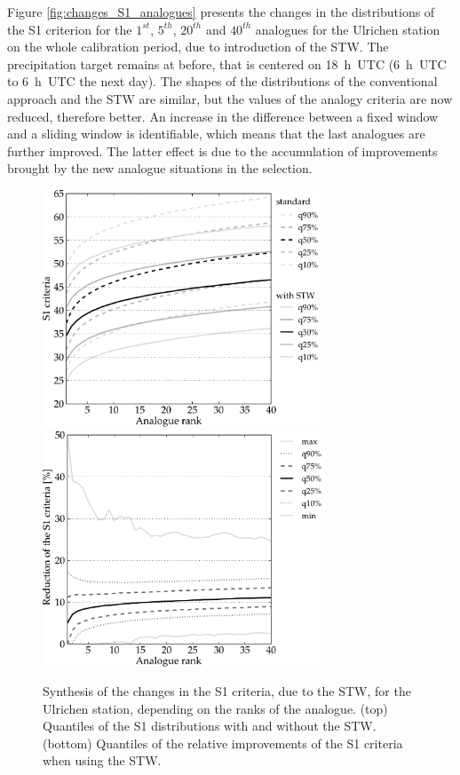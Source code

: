 \documentclass[hess]{copernicus}
\begin{document}
Figure \ref{fig:changes_S1_analogues} presents the changes in the distributions of the S1 criterion for the $1^{st}$, $5^{th}$, $20^{th}$ and $40^{th}$ analogues for the Ulrichen station on the whole calibration period, due to introduction of the STW. The precipitation target remains at before, that is centered on 18~h~UTC (6~h~UTC to 6~h~UTC the next day). The shapes of the distributions of the conventional approach and the STW are similar, but the values of the analogy criteria are now reduced, therefore better. An increase in the difference between a fixed window and a sliding window is identifiable, which means that the last analogues are further improved. The latter effect is due to the accumulation of improvements brought by the new analogue situations in the selection.

\begin{figure}[htb]
	\begin{center}
		\includegraphics[width=8.2cm]{figures/changes_S1_value.pdf} \\
		\includegraphics[width=8.3cm]{figures/changes_S1_gain.pdf}
	\end{center}
	\caption{Synthesis of the changes in the S1 criteria, due to the STW, for the Ulrichen station, depending on the ranks of the analogue. (top) Quantiles of the S1 distributions with and without the STW. (bottom) Quantiles of the relative improvements of the S1 criteria when using the STW.}
	\label{fig:changes_S1}
\end{figure}
\end{document}
